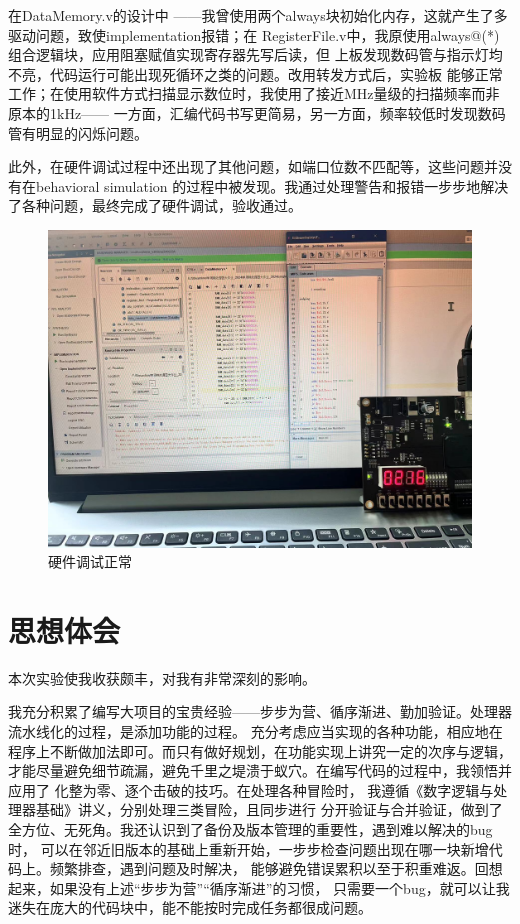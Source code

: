 \documentclass[10pt]{article}
\begin{document}
在DataMemory.v的设计中
——我曾使用两个always块初始化内存，这就产生了多驱动问题，致使implementation报错；在
RegisterFile.v中，我原使用always@(*)组合逻辑块，应用阻塞赋值实现寄存器先写后读，但
上板发现数码管与指示灯均不亮，代码运行可能出现死循环之类的问题。改用转发方式后，实验板
能够正常工作；在使用软件方式扫描显示数位时，我使用了接近MHz量级的扫描频率而非原本的1kHz——
一方面，汇编代码书写更简易，另一方面，频率较低时发现数码管有明显的闪烁问题。

此外，在硬件调试过程中还出现了其他问题，如端口位数不匹配等，这些问题并没有在behavioral simulation
的过程中被发现。我通过处理警告和报错一步步地解决了各种问题，最终完成了硬件调试，验收通过。

\begin{figure}[H]
    \centering
    \includegraphics[scale=0.1]{k.jpg}
    \caption{硬件调试正常}
    \end{figure}
\section{思想体会}
本次实验使我收获颇丰，对我有非常深刻的影响。

我充分积累了编写大项目的宝贵经验——步步为营、循序渐进、勤加验证。处理器流水线化的过程，是添加功能的过程。
充分考虑应当实现的各种功能，相应地在程序上不断做加法即可。而只有做好规划，在功能实现上讲究一定的次序与逻辑，
才能尽量避免细节疏漏，避免千里之堤溃于蚁穴。在编写代码的过程中，我领悟并应用了
化整为零、逐个击破的技巧。在处理各种冒险时，
我遵循《数字逻辑与处理器基础》讲义，分别处理三类冒险，且同步进行
分开验证与合并验证，做到了全方位、无死角。我还认识到了备份及版本管理的重要性，遇到难以解决的bug时，
可以在邻近旧版本的基础上重新开始，一步步检查问题出现在哪一块新增代码上。频繁排查，遇到问题及时解决，
能够避免错误累积以至于积重难返。回想起来，如果没有上述“步步为营”“循序渐进”的习惯，
只需要一个bug，就可以让我迷失在庞大的代码块中，能不能按时完成任务都很成问题。
\end{document}
